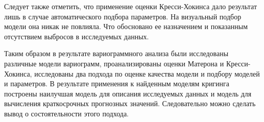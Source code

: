 

Следует также отметить, что применение оценки Кресси-Хокинса дало результат лишь в случае автоматического подбора параметров. На визуальный подбор модели она никак не повлияла. Что обосновано ее назначением и показанным отсутствием выбросов в исследуемых данных.

Таким образом в результате вариограммного анализа были исследованы различные модели вариограмм, проанализированы оценки Матерона и Кресси-Хокинса, исследованы два подхода по оценке качества модели и подбору моделей и параметров. В результате применения к найденным моделям кригинга построены наилучшая модель для описания исследуемых данных и модель для вычисления краткосрочных прогнозных значений. Следовательно можно сделать вывод о состоятельности этого подхода.


